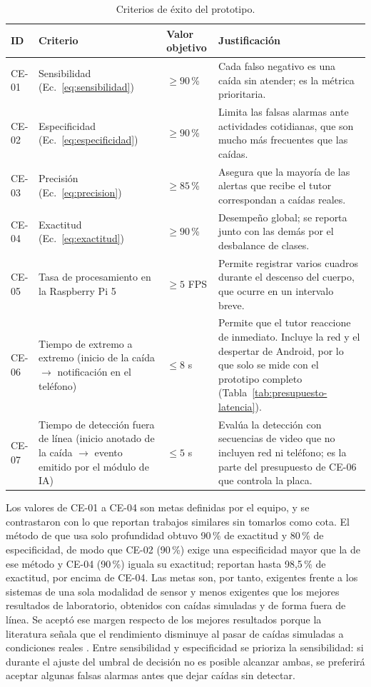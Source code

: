 \documentclass[12pt,a4paper,oneside]{book}
\theoremstyle{plain}
\theoremstyle{definition}
\theoremstyle{remark}
\begin{document}
\begin{table}[htbp]
\centering
\caption{Criterios de éxito del prototipo.}
\label{tab:criterios-exito}
\small
\begin{tabular}{L{1.3cm}L{3.3cm}L{2.0cm}L{4.5cm}}
\toprule
\textbf{ID} & \textbf{Criterio} & \textbf{Valor objetivo} & \textbf{Justificación} \\
\midrule
CE-01 & Sensibilidad (Ec.~\ref{eq:sensibilidad}) & $\geq 90$\,\% & Cada falso negativo es una caída sin atender; es la métrica prioritaria. \\
\addlinespace
CE-02 & Especificidad (Ec.~\ref{eq:especificidad}) & $\geq 90$\,\% & Limita las falsas alarmas ante actividades cotidianas, que son mucho más frecuentes que las caídas. \\
\addlinespace
CE-03 & Precisión (Ec.~\ref{eq:precision}) & $\geq 85$\,\% & Asegura que la mayoría de las alertas que recibe el tutor correspondan a caídas reales. \\
\addlinespace
CE-04 & Exactitud (Ec.~\ref{eq:exactitud}) & $\geq 90$\,\% & Desempeño global; se reporta junto con las demás por el desbalance de clases. \\
\addlinespace
CE-05 & Tasa de procesamiento en la Raspberry Pi 5 & $\geq 5$ FPS & Permite registrar varios cuadros durante el descenso del cuerpo, que ocurre en un intervalo breve. \\
\addlinespace
CE-06 & Tiempo de extremo a extremo (inicio de la caída $\rightarrow$ notificación en el teléfono) & $\leq 8$ s & Permite que el tutor reaccione de inmediato. Incluye la red y el despertar de Android, por lo que solo se mide con el prototipo completo (Tabla~\ref{tab:presupuesto-latencia}). \\
\addlinespace
CE-07 & Tiempo de detección fuera de línea (inicio anotado de la caída $\rightarrow$ evento emitido por el módulo de IA) & $\leq 5$ s & Evalúa la detección con secuencias de video que no incluyen red ni teléfono; es la parte del presupuesto de CE-06 que controla la placa. \\
\bottomrule
\end{tabular}
\end{table}

Los valores de CE-01 a CE-04 son metas definidas por el equipo, y se contrastaron con lo que reportan trabajos similares sin tomarlos como cota. El método de \textcite{kwolek2014human} que usa solo profundidad obtuvo 90\,\% de exactitud y 80\,\% de especificidad, de modo que CE-02 (90\,\%) exige una especificidad mayor que la de ese método y CE-04 (90\,\%) iguala su exactitud; \textcite{mobasheri2022fall} reportan hasta 98,5\,\% de exactitud, por encima de CE-04. Las metas son, por tanto, exigentes frente a los sistemas de una sola modalidad de sensor y menos exigentes que los mejores resultados de laboratorio, obtenidos con caídas simuladas y de forma fuera de línea. Se aceptó ese margen respecto de los mejores resultados porque la literatura señala que el rendimiento disminuye al pasar de caídas simuladas a condiciones reales \parencite{igual2013challenges}. Entre sensibilidad y especificidad se prioriza la sensibilidad: si durante el ajuste del umbral de decisión no es posible alcanzar ambas, se preferirá aceptar algunas falsas alarmas antes que dejar caídas sin detectar.
\end{document}
